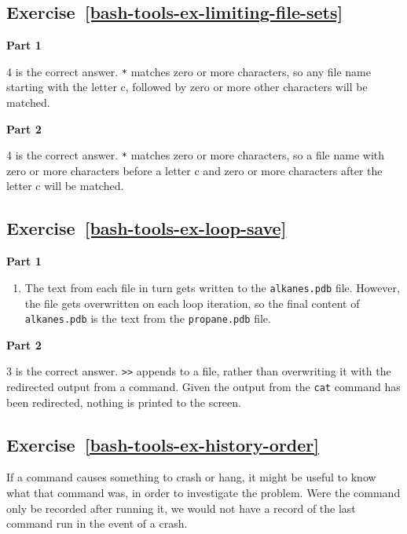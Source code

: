 \documentclass[
]{krantz}
\providecommand{\tightlist}{%
  \setlength{\itemsep}{0pt}\setlength{\parskip}{0pt}}
\begin{document}
\hypertarget{exercise-refbash-tools-ex-limiting-file-sets}{%
\subsection*{Exercise~\ref{bash-tools-ex-limiting-file-sets}}\label{exercise-refbash-tools-ex-limiting-file-sets}}


\textbf{Part 1}

4 is the correct answer. \texttt{*} matches zero or more characters, so any file name starting with
the letter c, followed by zero or more other characters will be matched.

\textbf{Part 2}

4 is the correct answer. \texttt{*} matches zero or more characters, so a file name with zero or more
characters before a letter c and zero or more characters after the letter c will be matched.

\hypertarget{exercise-refbash-tools-ex-loop-save}{%
\subsection*{Exercise~\ref{bash-tools-ex-loop-save}}\label{exercise-refbash-tools-ex-loop-save}}


\textbf{Part 1}

\begin{enumerate}
\def\labelenumi{\arabic{enumi}.}
\tightlist
\item
  The text from each file in turn gets written to the \texttt{alkanes.pdb} file.
  However, the file gets overwritten on each loop iteration, so the final content of \texttt{alkanes.pdb}
  is the text from the \texttt{propane.pdb} file.
\end{enumerate}

\textbf{Part 2}

3 is the correct answer. \texttt{\textgreater{}\textgreater{}} appends to a file, rather than overwriting it with the redirected
output from a command.
Given the output from the \texttt{cat} command has been redirected, nothing is printed to the screen.

\hypertarget{exercise-refbash-tools-ex-history-order}{%
\subsection*{Exercise~\ref{bash-tools-ex-history-order}}\label{exercise-refbash-tools-ex-history-order}}


If a command causes something to crash or hang, it might be useful
to know what that command was, in order to investigate the problem.
Were the command only be recorded after running it, we would not
have a record of the last command run in the event of a crash.
\end{document}
